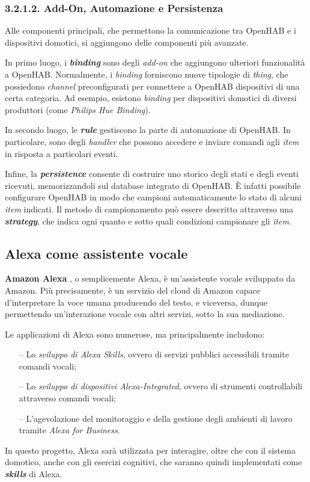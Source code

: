 \subsubsection{3.2.1.2. Add-On, Automazione e Persistenza}
\label{subsec:Sezione3.2.1.2}

Alle componenti principali, che permettono la comunicazione tra OpenHAB e i
dispositivi domotici, si aggiungono delle componenti più avanzate.

In primo luogo, i \textit{\textbf{binding}} \cite{BINDING} sono degli
\textit{add-on} che aggiungono ulteriori funzionalità a OpenHAB. Normalmente, i
\textit{binding} forniscono nuove tipologie di \textit{thing}, che possiedono
\textit{channel} preconfigurati per connettere a OpenHAB dispositivi di una
certa categoria. Ad esempio, esistono \textit{binding} per dispositivi domotici
di diversi produttori (come \textit{Philips Hue Binding}).

In secondo luogo, le \textit{\textbf{rule}} \cite{RULES} gestiscono la parte di
automazione di OpenHAB. In particolare, sono degli \textit{handler} che possono
accedere e inviare comandi agli \textit{item} in risposta a particolari eventi.

Infine, la \textit{\textbf{persistence}} \cite{PERSISTENCE} consente di
costruire uno storico degli stati e degli eventi ricevuti, memorizzandoli sul
database integrato di OpenHAB. È infatti possibile configurare OpenHAB in modo
che campioni automaticamente lo stato di alcuni \textit{item} indicati. Il
metodo di campionamento può essere descritto attraverso una
\textit{\textbf{strategy}}, che indica ogni quanto e sotto quali condizioni
campionare gli \textit{item}.

\subsection{Alexa come assistente vocale}
\label{subsec:Sezione3.2.2}

\textbf{Amazon Alexa} \cite{ALEXA}, o semplicemente Alexa, è un’assistente
vocale sviluppato da Amazon. Più precisamente, è un servizio del cloud di
Amazon capace d'interpretare la voce umana producendo del testo, e viceversa,
dunque permettendo un’interazione vocale con altri servizi, sotto la sua
mediazione.

Le applicazioni di Alexa sono numerose, ma principalmente includono:
\begin{itemize}
  \item[--] Lo \textit{sviluppo di Alexa Skills}, ovvero di servizi pubblici
        accessibili tramite comandi vocali;
  \item[--] Lo \textit{sviluppo di dispositivi Alexa-Integrated}, ovvero di
        strumenti controllabili attraverso comandi vocali;
  \item[--] L’agevolazione del monitoraggio e della gestione degli ambienti di
        lavoro tramite \textit{Alexa for Business}.
\end{itemize}
In questo progetto, Alexa sarà utilizzata per interagire, oltre che con il
sistema domotico, anche con gli esercizi cognitivi, che saranno quindi
implementati come \textit{\textbf{skills}} di Alexa.

